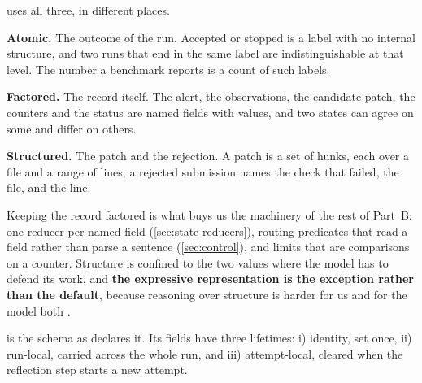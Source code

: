 \msa{} uses all three, in different places.

\bi

\item \textbf{Atomic.} The outcome of the run. Accepted or stopped is a label with no internal
structure, and two runs that end in the same label are indistinguishable at that level. The number
a benchmark reports is a count of such labels.

\item \textbf{Factored.} The record itself. The alert, the observations, the candidate patch, the
counters and the status are named fields with values, and two states can agree on some and differ
on others.

\item \textbf{Structured.} The patch and the rejection. A patch is a set of hunks, each over a file
and a range of lines; a rejected submission names the check that failed, the file, and the line.

\ei

Keeping the record factored is what buys us the machinery of the rest of Part~B: one reducer per
named field (\cref{sec:state-reducers}), routing predicates that read a field rather than parse a
sentence (\cref{sec:control}), and limits that are comparisons on a counter. Structure is confined
to the two values where the model has to defend its work, and \textbf{the expressive representation is
the exception rather than the default}, because reasoning over structure is harder for us and for
the model both \citep[\S2.4.7]{russell2020aima}.

 is the schema as  declares it. Its fields have three lifetimes: i) identity, set once, ii)
run-local, carried across the whole run, and iii) attempt-local, cleared when the reflection step
starts a new attempt.

